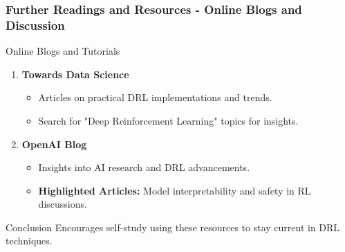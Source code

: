 \documentclass[aspectratio=169]{beamer}
\begin{document}
\begin{frame}[fragile]
  \frametitle{Further Readings and Resources - Online Blogs and Discussion}
  \begin{block}{Online Blogs and Tutorials}
    \begin{enumerate}
      \item \textbf{Towards Data Science}
        \begin{itemize}
          \item Articles on practical DRL implementations and trends.
          \item Search for "Deep Reinforcement Learning" topics for insights.
        \end{itemize}

      \item \textbf{OpenAI Blog}
        \begin{itemize}
          \item Insights into AI research and DRL advancements.
          \item \textbf{Highlighted Articles:} Model interpretability and safety in RL discussions.
        \end{itemize}
    \end{enumerate}
  \end{block}

  \begin{block}{Conclusion}
    Encourages self-study using these resources to stay current in DRL techniques.
  \end{block}
\end{frame}
\end{document}
